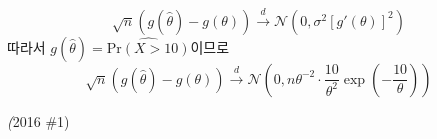 \documentclass[answers]{exam}
\begin{document}
\begin{questions}
\begin{solution}
\begin{enumerate}[(a)]
\begin{equation}
        \sqrt{n}\left(g\left(\widehat{\theta}\right)-g\left(\theta\right)\right)\xrightarrow{d}\mathcal{N}\left(0,\sigma^{2}\left[g'\left(\theta\right)\right]^{2}\right)
      \end{equation}
      따라서 $g\left(\widehat{\theta}\right)=\widehat{\mathrm{Pr}\left(X>10\right)}$이므로
      \begin{equation}
        \sqrt{n}\left(g\left(\widehat{\theta}\right)-g\left(\theta\right)\right)\xrightarrow{d}\mathcal{N}\left(0,n\theta^{-2}\cdot\dfrac{10}{\theta^{2}}\exp\left(-\dfrac{10}{\theta}\right)\right)
      \end{equation}
    \end{enumerate}
   \end{solution}
   \question
   \emph(2016 \#1) 
\end{questions}
\end{document}
